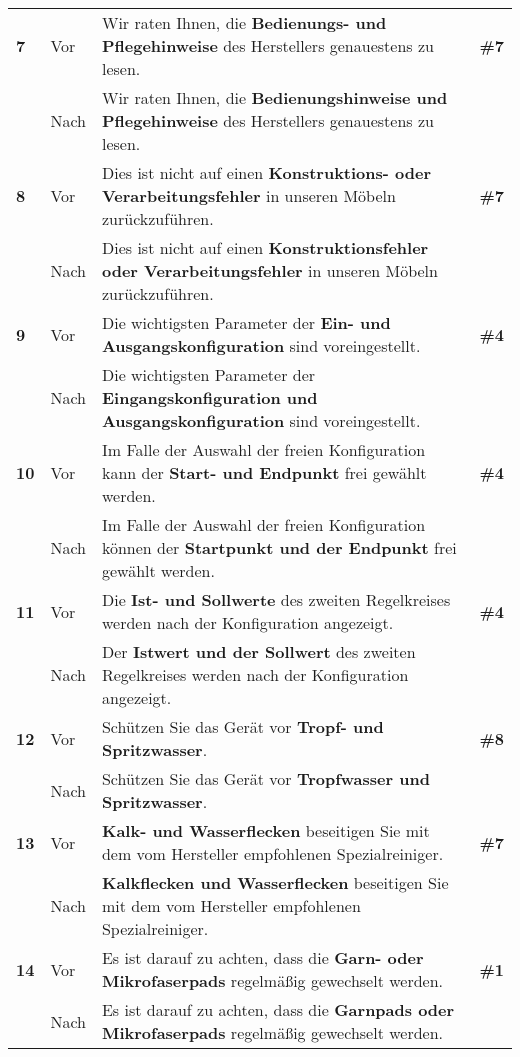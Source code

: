 \begin{longtable}{llp{}l}
\tablevspace
{ \textbf{7}} & Vor & Wir raten Ihnen, die \textbf{Bedienungs- und Pflegehinweise} des Herstellers genauestens zu lesen. & \textbf{\#7}\\
& Nach & Wir raten Ihnen, die \textbf{Bedienungshinweise und Pflegehinweise} des Herstellers genauestens zu lesen. & \\
\tablevspace
{ \textbf{8}} & Vor & Dies ist nicht auf einen \textbf{Konstruktions- oder Verarbeitungsfehler} in unseren Möbeln zurückzuführen. & \textbf{\#7}\\
& Nach & Dies ist nicht auf einen \textbf{Konstruktionsfehler oder Verarbeitungsfehler} in unseren Möbeln zurückzuführen. & \\
\tablevspace
{ \textbf{9}} & Vor & Die wichtigsten Parameter der \textbf{Ein- und Ausgangskonfiguration} sind voreingestellt. & \textbf{\#4}\\
& Nach & Die wichtigsten Parameter der \textbf{Eingangskonfiguration und Ausgangskonfiguration} sind voreingestellt. & \\
\tablevspace
{ \textbf{10}} & Vor & Im Falle der Auswahl der freien Konfiguration kann der \textbf{Start- und Endpunkt} frei gewählt werden. & \textbf{\#4}\\
& Nach & Im Falle der Auswahl der freien Konfiguration können der \textbf{Startpunkt und der Endpunkt} frei gewählt werden. & \\
\tablevspace
{ \textbf{11}} & Vor & Die \textbf{Ist- und Sollwerte} des zweiten Regelkreises werden nach der Konfiguration angezeigt. & \textbf{\#4}\\
& Nach & Der \textbf{Istwert und der Sollwert} des zweiten Regelkreises werden nach der Konfiguration angezeigt. & \\
\tablevspace
{ \textbf{12}} & Vor & Schützen Sie das Gerät vor \textbf{Tropf- und Spritzwasser}. & \textbf{\#8}\\
& Nach & Schützen Sie das Gerät vor \textbf{Tropfwasser und Spritzwasser}. & \\
\tablevspace
{ \textbf{13}} & Vor & \textbf{Kalk- und Wasserflecken} beseitigen Sie mit dem vom Hersteller empfohlenen Spezialreiniger. & \textbf{\#7}\\
& Nach & \textbf{Kalkflecken und Wasserflecken} beseitigen Sie mit dem vom Hersteller empfohlenen Spezialreiniger. & \\
\tablevspace
{ \textbf{14}} & Vor & Es ist darauf zu achten, dass die \textbf{Garn- oder Mikrofaserpads} regelmäßig gewechselt werden. & \textbf{\#1}\\
& Nach & Es ist darauf zu achten, dass die \textbf{Garnpads oder Mikrofaserpads} regelmäßig gewechselt werden. & \\

\end{longtable}
